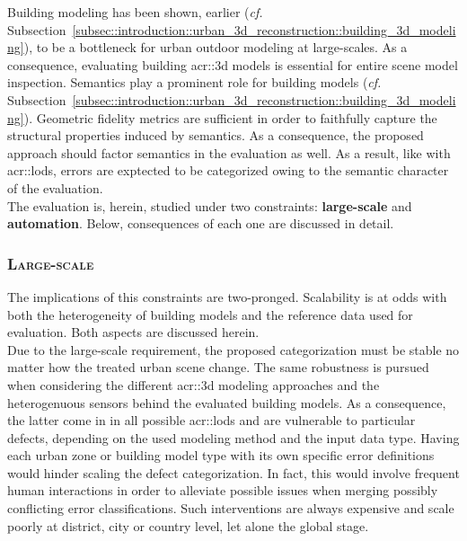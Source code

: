         Building modeling has been shown, earlier (\textit{cf.} Subsection~\ref{subsec::introduction::urban_3d_reconstruction::building_3d_modeling}), to be a bottleneck for urban outdoor modeling at large-scales.
        As a consequence, evaluating building \gls{acr::3d} models is essential for entire scene model inspection.
        Semantics play a prominent role for building models (\textit{cf.} Subsection~\ref{subsec::introduction::urban_3d_reconstruction::building_3d_modeling}).
        Geometric fidelity metrics are sufficient in order to faithfully capture the structural properties induced by semantics.
        As a consequence, the proposed approach should factor semantics in the evaluation as well.
        As a result, like with \glspl{acr::lod}, errors are exptected to be categorized owing to the semantic character of the evaluation.\\

        The evaluation is, herein, studied under two constraints: \textbf{large-scale} and \textbf{automation}.
        Below, consequences of each one are discussed in detail.
        \subsubsection{\textsc{Large-scale}}
            The implications of this constraints are two-pronged.
            Scalability is at odds with both the heterogeneity of building models and the reference data used for evaluation.
            Both aspects are discussed herein.\\

            Due to the large-scale requirement, the proposed categorization must be stable no matter how the treated urban scene change.
            The same robustness is pursued when considering the different \gls{acr::3d} modeling approaches and the heterogenuous sensors behind the evaluated building models.
            As a consequence, the latter come in in all possible \glspl{acr::lod} and are vulnerable to particular defects, depending on the used modeling method and the input data type.
            Having each urban zone or building model type with its own specific error definitions would hinder scaling the defect categorization.
            In fact, this would involve frequent human interactions in order to alleviate possible issues when merging possibly conflicting error classifications.
            Such interventions are always expensive and scale poorly at district, city or country level, let alone the global stage.\\


